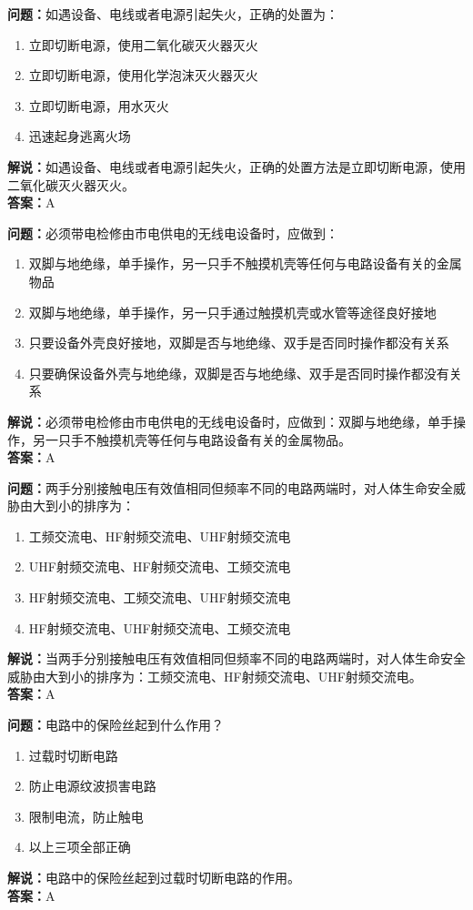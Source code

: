\documentclass[UTF8]{ctexbook}
\begin{document}
\textbf{问题：}如遇设备、电线或者电源引起失火，正确的处置为：
\begin{enumerate}[label=\Alph*), leftmargin=3em]
  \item 立即切断电源，使用二氧化碳灭火器灭火
  \item 立即切断电源，使用化学泡沫灭火器灭火
  \item 立即切断电源，用水灭火
  \item 迅速起身逃离火场
\end{enumerate}
\textbf{解说：}如遇设备、电线或者电源引起失火，正确的处置方法是立即切断电源，使用二氧化碳灭火器灭火。\\
\textbf{答案：}A

\textbf{问题：}必须带电检修由市电供电的无线电设备时，应做到：
\begin{enumerate}[label=\Alph*), leftmargin=3em]
  \item 双脚与地绝缘，单手操作，另一只手不触摸机壳等任何与电路设备有关的金属物品
  \item 双脚与地绝缘，单手操作，另一只手通过触摸机壳或水管等途径良好接地
  \item 只要设备外壳良好接地，双脚是否与地绝缘、双手是否同时操作都没有关系
  \item 只要确保设备外壳与地绝缘，双脚是否与地绝缘、双手是否同时操作都没有关系
\end{enumerate}
\textbf{解说：}必须带电检修由市电供电的无线电设备时，应做到：双脚与地绝缘，单手操作，另一只手不触摸机壳等任何与电路设备有关的金属物品。\\
\textbf{答案：}A

\textbf{问题：}两手分别接触电压有效值相同但频率不同的电路两端时，对人体生命安全威胁由大到小的排序为：
\begin{enumerate}[label=\Alph*), leftmargin=3em]
  \item 工频交流电、HF射频交流电、UHF射频交流电
  \item UHF射频交流电、HF射频交流电、工频交流电
  \item HF射频交流电、工频交流电、UHF射频交流电
  \item HF射频交流电、UHF射频交流电、工频交流电
\end{enumerate}
\textbf{解说：}当两手分别接触电压有效值相同但频率不同的电路两端时，对人体生命安全威胁由大到小的排序为：工频交流电、HF射频交流电、UHF射频交流电。\\
\textbf{答案：}A

\textbf{问题：}电路中的保险丝起到什么作用？
\begin{enumerate}[label=\Alph*), leftmargin=3em]
  \item 过载时切断电路
  \item 防止电源纹波损害电路
  \item 限制电流，防止触电
  \item 以上三项全部正确
\end{enumerate}
\textbf{解说：}电路中的保险丝起到过载时切断电路的作用。\\
\textbf{答案：}A
\end{document}
